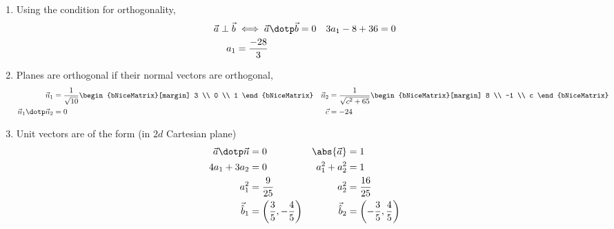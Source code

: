 \begin{enumerate}
      \item Using the condition for orthogonality,
            \begin{align}
                  \vec{a} \perp \vec{b} & \iff \vec{a} \dotp \vec{b} = 0 &
                  3a_1 - 8 + 36         & = 0                              \\
                  a_1                   & = \frac{-28}{3}
            \end{align}

      \item Planes are orthogonal if their normal vectors are orthogonal,
            \begin{align}
                  \vec{n}_1                   & = \frac{1}{\sqrt{10}}
                  \begin{bNiceMatrix}[margin]
                        3 \\ 0 \\ 1
                  \end{bNiceMatrix} &
                  \vec{n}_2                   & = \frac{1}{\sqrt{c^2 + 65}}
                  \begin{bNiceMatrix}[margin]
                        8 \\ -1 \\ c
                  \end{bNiceMatrix}                                  \\
                  \vec{n}_1 \dotp \vec{n}_2   & = 0                         &
                  \vec{c}                     & = -24
            \end{align}

      \item Unit vectors are of the form (in $2d$ Cartesian plane)
            \begin{align}
                  \vec{a} \dotp \vec{n} & = 0                                        &
                  \abs{\vec{a}}         & = 1                                          \\
                  4a_1 + 3a_2           & = 0                                        &
                  a_1^2 + a_2^2         & = 1                                          \\
                  a_1^2                 & = \frac{9}{25}                             &
                  a_2^2                 & = \frac{16}{25}                              \\
                  \vec{\hat{b}}_1       & = \left( \frac{3}{5}, -\frac{4}{5} \right) &
                  \vec{\hat{b}}_2       & = \left( -\frac{3}{5}, \frac{4}{5} \right)
            \end{align}


\end{enumerate}
